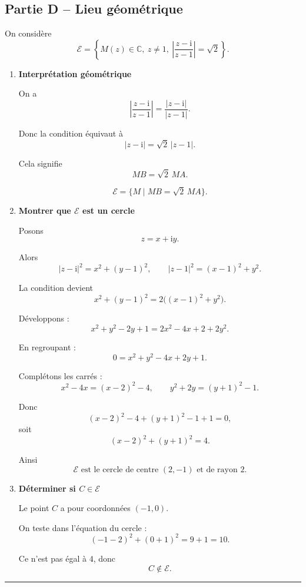 \documentclass[11pt,a4paper]{article}
\newcommand{\C}{\mathbb{C}}
\newcommand{\ii}{\mathrm{i}}
\begin{document}
\subsection*{Partie D -- Lieu géométrique}

On considère
\[
\mathcal E=\left\{M(z)\in\C,\ z\neq 1,\ \left|\frac{z-\ii}{z-1}\right|=\sqrt2\right\}.
\]

\begin{enumerate}[label=\textbf{3.\arabic*}, resume, leftmargin=1.6em]

\item \textbf{Interprétation géométrique}

On a
\[
\left|\frac{z-\ii}{z-1}\right|=\frac{|z-\ii|}{|z-1|}.
\]

Donc la condition équivaut à
\[
|z-\ii|=\sqrt2\,|z-1|.
\]

Cela signifie
\[
MB=\sqrt2\,MA.
\]

\[
\boxed{\mathcal E=\{M\mid MB=\sqrt2\,MA\}.}
\]

\item \textbf{Montrer que \(\mathcal E\) est un cercle}

Posons
\[
z=x+\ii y.
\]

Alors
\[
|z-\ii|^2=x^2+(y-1)^2,
\qquad
|z-1|^2=(x-1)^2+y^2.
\]

La condition devient
\[
x^2+(y-1)^2=2\big((x-1)^2+y^2\big).
\]

Développons :
\[
x^2+y^2-2y+1=2x^2-4x+2+2y^2.
\]

En regroupant :
\[
0=x^2+y^2-4x+2y+1.
\]

Complétons les carrés :
\[
x^2-4x=(x-2)^2-4,
\qquad
y^2+2y=(y+1)^2-1.
\]

Donc
\[
(x-2)^2-4+(y+1)^2-1+1=0,
\]
soit
\[
(x-2)^2+(y+1)^2=4.
\]

Ainsi
\[
\boxed{\mathcal E \text{ est le cercle de centre }(2,-1)\text{ et de rayon }2.}
\]

\item \textbf{Déterminer si \(C\in \mathcal E\)}

Le point \(C\) a pour coordonnées \((-1,0)\).

On teste dans l’équation du cercle :
\[
(-1-2)^2+(0+1)^2=9+1=10.
\]

Ce n’est pas égal à \(4\), donc
\[
\boxed{C\notin \mathcal E.}
\]

\end{enumerate}

\vspace{0.6em}
\hrule
\vspace{0.6em}
\end{document}
